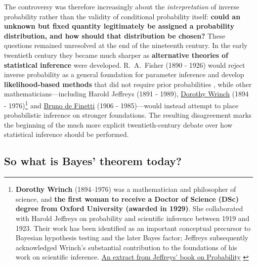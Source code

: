 The controversy was therefore increasingly about the \emph{interpretation} of inverse probability rather than the validity of conditional probability itself: \textbf{could an unknown but fixed quantity legitimately be assigned a probability distribution, and how should that distribution be chosen?} These questions remained unresolved at the end of the nineteenth century. In the early twentieth century they became much sharper as \textbf{alternative theories of statistical inference} were developed. R.~A.~Fisher (1890 - 1926) would reject inverse probability as a general foundation for parameter inference and develop \textbf{likelihood-based methods} that did not require prior probabilities \cite{fisher1922}, while other mathematicians---including Harold Jeffreys (1891 - 1989), \href{https://en.wikipedia.org/wiki/Dorothy_Maud_Wrinch}{Dorothy Wrinch} (1894 - 1976)\footnote{\textbf{Dorothy Wrinch} (1894–1976) was a mathematician and philosopher of science, and \textbf{the first woman to receive a Doctor of Science (DSc) degree from Oxford University (awarded in 1929)}. She collaborated with Harold Jeffreys on probability and scientific inference between 1919 and 1923. Their work has been identified as an important conceptual precursor to Bayesian hypothesis testing and the later Bayes factor; Jeffreys subsequently acknowledged Wrinch's substantial contribution to the foundations of his work on scientific inference. \href{https://mathshistory.st-andrews.ac.uk/Extras/Jeffreys_Probability/}{An extract from Jeffreys' book on Probability} \cite{wrinchjeffreys1919,wrinchjeffreys1921,jeffreys1973} } and \href{https://en.wikipedia.org/wiki/Bruno_de_Finetti}{Bruno de Finetti} (1906 - 1985)---would instead attempt to place probabilistic inference on stronger foundations. The resulting disagreement marks the beginning of the much more explicit twentieth-century debate over how statistical inference should be performed.


\subsection{So what is Bayes' theorem today?} 

